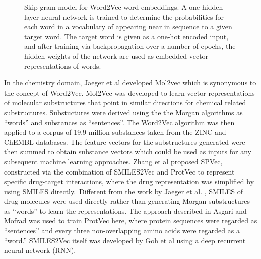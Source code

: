 \documentclass[
  super,
  preprint,
  3p]{elsarticle}
\begin{document}
\begin{figure}


\caption{\label{fig-skip}Skip gram model for Word2Vec word embeddings. A
one hidden layer neural network is trained to determine the
probabilities for each word in a vocabulary of appearing near in
sequence to a given target word. The target word is given as a one-hot
encoded input, and after training via backpropagation over a number of
epochs, the hidden weights of the network are used as embedded vector
representations of words.}

\end{figure}%

In the chemistry domain, Jaeger et al \citep{jaeger_mol2vec_2018}
developed Mol2vec which is synonymous to the concept of Word2Vec.
Mol2Vec was developed to learn vector representations of molecular
substructures that point in similar directions for chemical related
substructures. Substuctures were derived using the the Morgan algorithms
as ``words'' and substances as ``sentences''. The Word2Vec algorithm was
then applied to a corpus of 19.9 million substances taken from the ZINC
and ChEMBL databases. The feature vectors for the substructures
generated were then summed to obtain substance vectors which could be
used as inputs for any subsequent machine learning approaches. Zhang et
al \citep{zhang_spvec_2019} proposed SPVec, constructed via the
combination of SMILES2Vec and ProtVec to represent specific drug-target
interactions, where the drug representation was simplified by using
SMILES directly.~Different from the work by Jaeger et al.
\citep{jaeger_mol2vec_2018}, SMILES of drug molecules were used directly
rather than generating Morgan substructures as ``words'' to learn the
representations. The approach described in Asgari and Mofrad
\citep{asgari_continuous_2015} was used to train ProtVec here, where
protein sequences were regarded as ``sentences'' and every three
non-overlapping amino acids were regarded as a ``word.'' SMILES2Vec
itself was developed by Goh et al \citep{goh_smiles2vec_2018} using a
deep recurrent neural network (RNN).
\end{document}
